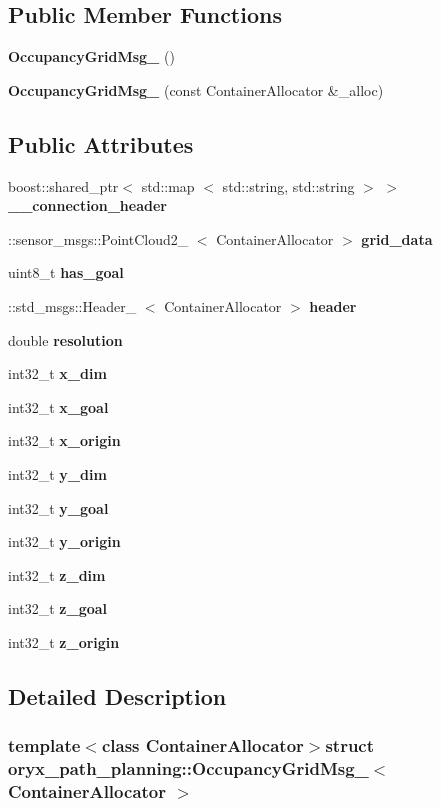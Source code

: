 \subsection*{\-Public \-Member \-Functions}
\begin{DoxyCompactItemize}
\item 
{\bf \-Occupancy\-Grid\-Msg\-\_\-} ()
\item 
{\bf \-Occupancy\-Grid\-Msg\-\_\-} (const \-Container\-Allocator \&\-\_\-alloc)
\end{DoxyCompactItemize}
\subsection*{\-Public \-Attributes}
\begin{DoxyCompactItemize}
\item 
boost\-::shared\-\_\-ptr$<$ std\-::map\*
$<$ std\-::string, std\-::string $>$ $>$ {\bf \-\_\-\-\_\-connection\-\_\-header}
\item 
\-::sensor\-\_\-msgs\-::\-Point\-Cloud2\-\_\-\*
$<$ \-Container\-Allocator $>$ {\bf grid\-\_\-data}
\item 
uint8\-\_\-t {\bf has\-\_\-goal}
\item 
\-::std\-\_\-msgs\-::\-Header\-\_\-\*
$<$ \-Container\-Allocator $>$ {\bf header}
\item 
double {\bf resolution}
\item 
int32\-\_\-t {\bf x\-\_\-dim}
\item 
int32\-\_\-t {\bf x\-\_\-goal}
\item 
int32\-\_\-t {\bf x\-\_\-origin}
\item 
int32\-\_\-t {\bf y\-\_\-dim}
\item 
int32\-\_\-t {\bf y\-\_\-goal}
\item 
int32\-\_\-t {\bf y\-\_\-origin}
\item 
int32\-\_\-t {\bf z\-\_\-dim}
\item 
int32\-\_\-t {\bf z\-\_\-goal}
\item 
int32\-\_\-t {\bf z\-\_\-origin}
\end{DoxyCompactItemize}


\subsection{\-Detailed \-Description}
\subsubsection*{template$<$class Container\-Allocator$>$struct oryx\-\_\-path\-\_\-planning\-::\-Occupancy\-Grid\-Msg\-\_\-$<$ Container\-Allocator $>$}



